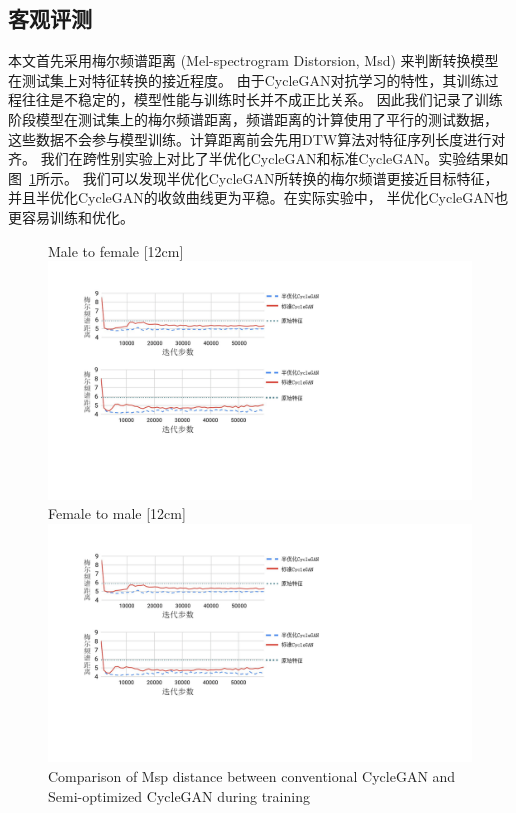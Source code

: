 \subsection{客观评测}
本文首先采用梅尔频谱距离 (Mel-spectrogram Distorsion, Msd) 来判断转换模型在测试集上对特征转换的接近程度。
由于CycleGAN对抗学习的特性，其训练过程往往是不稳定的，模型性能与训练时长并不成正比关系。
因此我们记录了训练阶段模型在测试集上的梅尔频谱距离，频谱距离的计算使用了平行的测试数据，
这些数据不会参与模型训练。计算距离前会先用DTW算法对特征序列长度进行对齐。
我们在跨性别实验上对比了半优化CycleGAN和标准CycleGAN。实验结果如图~\ref{fig:msd}所示。
我们可以发现半优化CycleGAN所转换的梅尔频谱更接近目标特征，并且半优化CycleGAN的收敛曲线更为平稳。在实际实验中，
半优化CycleGAN也更容易训练和优化。

\begin{figure}[!hbtp]
    \centering
                    {Male to female}%
                    [12cm]{\includegraphics[width=12cm,trim=50 320 350 60,clip]{figure/4_msd.png}} \\
    \vspace{0.5cm}
                    {Female to male}%
                    [12cm]{\includegraphics[width=12cm,trim=50 150 350 240,clip]{figure/4_msd.png}}
              {Comparison of Msp distance between conventional CycleGAN and Semi-optimized CycleGAN during training}
    \label{fig:msd}
  \end{figure}

